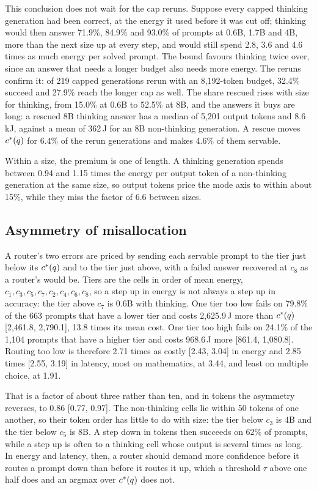 This conclusion does not wait for the cap reruns. Suppose every capped
thinking generation had been correct, at the energy it used before it was cut
off; thinking would then answer 71.9\%, 84.9\% and 93.0\% of prompts at 0.6B,
1.7B and 4B, more than the next size up at every step, and would still spend
2.8, 3.6 and 4.6 times as much energy per solved prompt. The bound favours
thinking twice over, since an answer that needs a longer budget also needs
more energy. The reruns confirm it: of 219 capped generations rerun with an
8{,}192-token budget, 32.4\% succeed and 27.9\% reach the longer cap as well.
The share rescued rises with size for thinking, from 15.0\% at 0.6B to 52.5\%
at 8B, and the answers it buys are long: a rescued 8B thinking answer has a
median of 5{,}201 output tokens and 8.6\,kJ, against a mean of 362\,J for an
8B non-thinking generation. A rescue moves $c^{*}(q)$ for 6.4\% of the rerun
generations and makes 4.6\% of them servable.

Within a size, the premium is one of length. A thinking generation spends
between 0.94 and 1.15 times the energy per output token of a non-thinking
generation at the same size, so output tokens price the mode axis to within
about 15\%, while they miss the factor of 6.6 between sizes.

\subsection{Asymmetry of misallocation}
\label{sec:results-asymmetry}

A router's two errors are priced by sending each servable prompt to the tier
just below its $c^{*}(q)$ and to the tier just above, with a failed answer
recovered at $c_8$ as a router's would be. Tiers are the cells in order of
mean energy, $c_1, c_3, c_5, c_7, c_2, c_4, c_6, c_8$, so a step up in energy
is not always a step up in accuracy: the tier above $c_7$ is 0.6B with
thinking. One tier too low fails on 79.8\% of the 663 prompts that have a
lower tier and costs 2{,}625.9\,J more than $c^{*}(q)$ [2{,}461.8,
2{,}790.1], 13.8 times its mean cost. One tier too high fails on 24.1\% of
the 1{,}104 prompts that have a higher tier and costs 968.6\,J more [861.4,
1{,}080.8]. Routing too low is therefore 2.71 times as costly [2.43, 3.04] in
energy and 2.85 times [2.55, 3.19] in latency, most on mathematics, at 3.44,
and least on multiple choice, at 1.91.

That is a factor of about three rather than ten, and in tokens the asymmetry
reverses, to 0.86 [0.77, 0.97]. The non-thinking cells lie within 50 tokens
of one another, so their token order has little to do with size: the tier
below $c_3$ is 4B and the tier below $c_5$ is 8B. A step down in tokens then
succeeds on 62\% of prompts, while a step up is often to a thinking cell
whose output is several times as long. In energy and latency, then, a router
should demand more confidence before it routes a prompt down than before it
routes it up, which a threshold $\tau$ above one half does and an argmax over
$c^{*}(q)$ does not.

